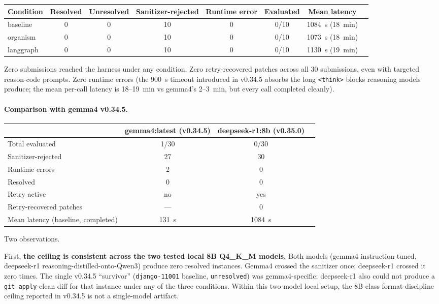 \begin{center}
\small
\begin{tabular}{@{}lccccccc@{}}
\toprule
\textbf{Condition} & \textbf{Resolved} & \textbf{Unresolved} & \textbf{Sanitizer-rejected} & \textbf{Runtime error} & \textbf{Evaluated} & \textbf{Mean latency} \\
\midrule
baseline    & 0 & 0 & 10 & 0 & 0/10 & 1084~s (18~min) \\
organism    & 0 & 0 & 10 & 0 & 0/10 & 1073~s (18~min) \\
langgraph   & 0 & 0 & 10 & 0 & 0/10 & 1130~s (19~min) \\
\bottomrule
\end{tabular}
\end{center}

Zero submissions reached the harness under any condition. Zero retry-recovered patches across all 30 submissions, even with targeted reason-code prompts. Zero runtime errors (the 900~s timeout introduced in v0.34.5 absorbs the long \texttt{<think>} blocks reasoning models produce; the mean per-call latency is 18--19~min vs gemma4's 2--3~min, but every call completed cleanly).

\paragraph{Comparison with gemma4 v0.34.5.}

\begin{center}
\small
\begin{tabular}{@{}lccc@{}}
\toprule
 & \textbf{gemma4:latest (v0.34.5)} & \textbf{deepseek-r1:8b (v0.35.0)} \\
\midrule
Total evaluated                   & 1/30 & 0/30 \\
Sanitizer-rejected                & 27   & 30 \\
Runtime errors                    & 2    & 0 \\
Resolved                          & 0    & 0 \\
Retry active                      & no   & yes \\
Retry-recovered patches           & ---  & 0 \\
Mean latency (baseline, completed)& 131~s & 1084~s \\
\bottomrule
\end{tabular}
\end{center}

Two observations.

First, \textbf{the ceiling is consistent across the two tested local 8B Q4\_K\_M models.} Both models (gemma4 instruction-tuned, deepseek-r1 reasoning-distilled-onto-Qwen3) produce zero resolved instances. Gemma4 crossed the sanitizer once; deepseek-r1 crossed it zero times. The single v0.34.5 ``survivor'' (\texttt{django-11001} baseline, \texttt{unresolved}) was gemma4-specific: deepseek-r1 also could not produce a \texttt{git apply}-clean diff for that instance under any of the three conditions. Within this two-model local setup, the 8B-class format-discipline ceiling reported in v0.34.5 is not a single-model artifact.

